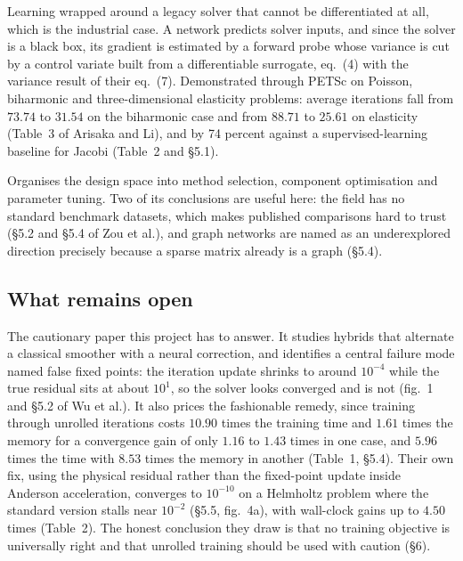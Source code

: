 \documentclass[11pt, a4paper]{article}
\begin{document}
\begin{description}[style=nextline]
  Learning wrapped around a legacy solver that cannot be differentiated at
  all, which is the industrial case. A network predicts solver inputs, and
  since the solver is a black box, its gradient is estimated by a forward
  probe whose variance is cut by a control variate built from a differentiable
  surrogate, eq.~(4) with the variance result of their eq.~(7). Demonstrated
  through PETSc on Poisson, biharmonic and three-dimensional elasticity
  problems: average iterations fall from $73.74$ to $31.54$ on the biharmonic
  case and from $88.71$ to $25.61$ on elasticity (Table~3 of Arisaka and Li),
  and by 74 percent against a supervised-learning baseline for Jacobi
  (Table~2 and \S{}5.1).
  \item[Zou, Xu and Zhang, survey~\citep{itersurvey}]
  Organises the design space into method selection, component optimisation
  and parameter tuning. Two of its conclusions are useful here: the field has
  no standard benchmark datasets, which makes published comparisons hard to
  trust (\S{}5.2 and \S{}5.4 of Zou et al.), and graph networks are named as an
  underexplored direction precisely because a sparse matrix already is a
  graph (\S{}5.4).
\end{description}

\subsection{What remains open}

\begin{description}[style=nextline]
  \item[Wu et al., are hybrid solvers reliable?~\citep{hybridreliable}]
  The cautionary paper this project has to answer. It studies hybrids that
  alternate a classical smoother with a neural correction, and identifies a
  central failure mode named false fixed points: the iteration update shrinks
  to around $10^{-4}$ while the true residual sits at about $10^{1}$, so the
  solver looks converged and is not (fig.~1 and \S{}5.2 of Wu et al.). It also
  prices the fashionable remedy, since training through unrolled iterations
  costs $10.90$ times the training time and $1.61$ times the memory for a
  convergence gain of only $1.16$ to $1.43$ times in one case, and $5.96$
  times the time with $8.53$ times the memory in another (Table~1, \S{}5.4).
  Their own fix, using the physical residual rather than the fixed-point
  update inside Anderson acceleration, converges to $10^{-10}$ on a Helmholtz
  problem where the standard version stalls near $10^{-2}$ (\S{}5.5, fig.~4a),
  with wall-clock gains up to $4.50$ times (Table~2). The honest conclusion
  they draw is that no training objective is universally right and that
  unrolled training should be used with caution (\S{}6).
\end{description}
\end{document}
